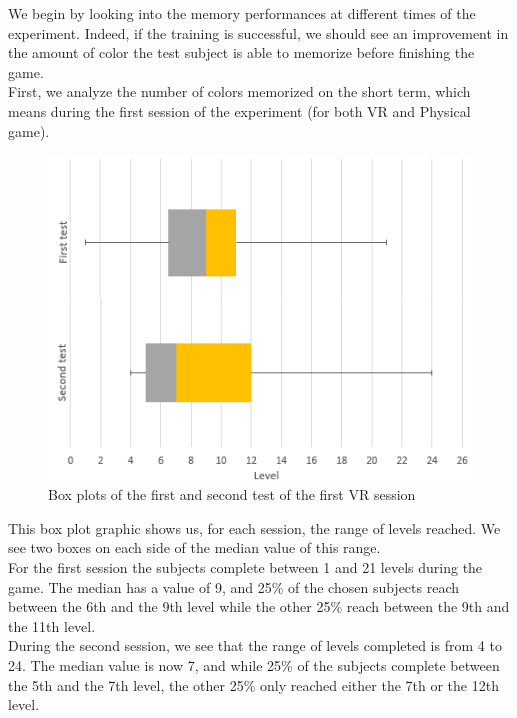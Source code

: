 \documentclass[12pt, openany, twocolumn]{article}
\begin{document}

    We begin by looking into the memory performances at different times of the experiment. Indeed, if the training is successful, we should see an improvement in the amount of color the test subject is able to memorize before finishing the game.
    \\
    First, we analyze the number of colors memorized on the short term, which means during the first session of the experiment (for both VR and Physical game).\\
    

        \begin{figure}
            \includegraphics[scale=0.74]{graphics/boxplot-vr-firstandsecondtest.png}
            \caption{Box plots of the first and second test of the first VR session}
        \end{figure}

        This box plot graphic shows us, for each session, the range of levels reached. We see two boxes on each side of the median value of this range. \\
        For the first session the subjects complete between 1 and 21 levels during the game. The median has a value of 9, and 25\% of the chosen subjects reach between the 6th and
        the 9th level while the other 25\% reach between the 9th and the 11th level. \\
        During the second session, we see that the range of levels completed is from 4 to 24. The median value is now 7, and while 25\% of the subjects complete between the 5th and the 7th level,
        the other 25\% only reached either the 7th or the 12th level. \\
\end{document}
